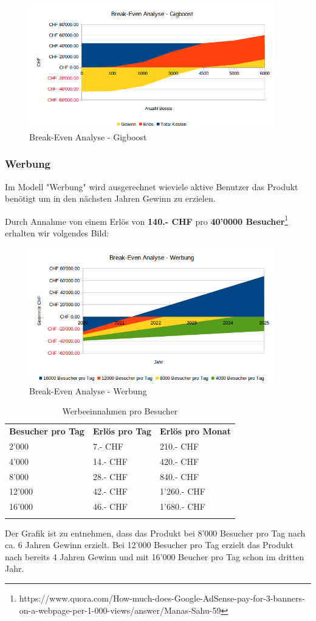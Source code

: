 \begin{figure}[!htb]
  \centering
  \includegraphics[width=0.95\textwidth]{initialisierung/wirtschaftlichkeit-gigboost.png}
  \caption{Break-Even Analyse - Gigboost}
\end{figure}

\clearpage
\subsubsection{Werbung}

Im Modell "Werbung" wird ausgerechnet wieviele aktive Benutzer das Produkt benötigt
um in den nächsten Jahren Gewinn zu erzielen.

Durch Annahme von einem Erlös von \textbf{140.- CHF} pro \textbf{40'0000 Besucher}\footnote{https://www.quora.com/How-much-does-Google-AdSense-pay-for-3-banners-on-a-webpage-per-1-000-views/answer/Manas-Sahu-59} erhalten wir volgendes Bild:

\begin{figure}[!htb]
  \centering
  \includegraphics[width=0.95\textwidth]{initialisierung/wirtschaftlichkeit-werbung.png}
  \caption{Break-Even Analyse - Werbung}
\end{figure}

\begin{longtable}[]{@{}lll@{}}
  \toprule
  \textbf{Besucher pro Tag} & \textbf{Erlös pro Tag} & \textbf{Erlös pro Monat}\tabularnewline
   2'000                    & 7.- CHF                & 210.- CHF\tabularnewline
   4'000                    & 14.- CHF               & 420.- CHF\tabularnewline
   8'000                    & 28.- CHF               & 840.- CHF\tabularnewline
  12'000                    & 42.- CHF               & 1'260.- CHF\tabularnewline
  16'000                    & 46.- CHF               & 1'680.- CHF\tabularnewline
  \bottomrule
  \caption{Werbeeinnahmen pro Besucher}
\end{longtable}

Der Grafik ist zu entnehmen, dass das Produkt bei 8'000 Besucher pro Tag nach ca. 6 Jahren Gewinn erzielt. Bei 12'000 Besucher pro Tag erzielt das Produkt nach bereits 4 Jahren Gewinn und mit 16'000 Beucher pro Tag schon im dritten Jahr.
